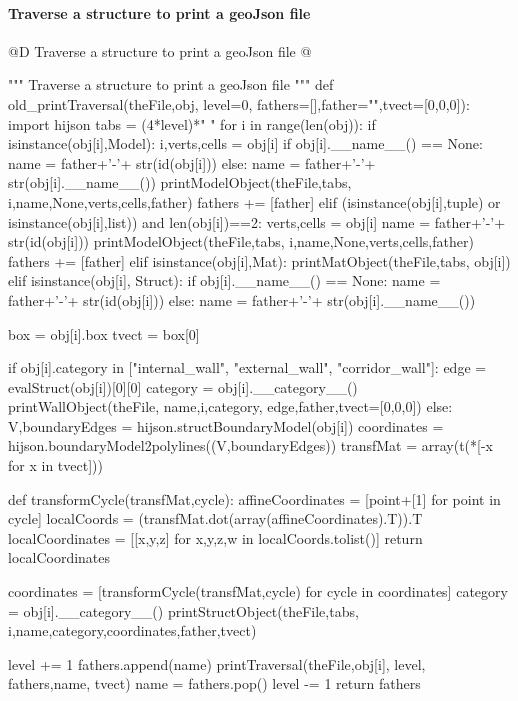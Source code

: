 \documentclass[11pt,oneside]{article}	%
\begin{document}
\paragraph{Traverse a structure to print a geoJson file}

@D Traverse a structure to print a geoJson file
@{""" Traverse a structure to print a geoJson file """
def old_printTraversal(theFile,obj, level=0, fathers=[],father="",tvect=[0,0,0]):
   import hijson
   tabs = (4*level)*" "
   for i in range(len(obj)):
	  if isinstance(obj[i],Model): 
		 i,verts,cells = obj[i]
		 if obj[i].__name__() == None:
			name = father+'-'+ str(id(obj[i]))
		 else: 
			name = father+'-'+ str(obj[i].__name__())
		 printModelObject(theFile,tabs, i,name,None,verts,cells,father)
		 fathers += [father]
	  elif (isinstance(obj[i],tuple) or isinstance(obj[i],list)) and len(obj[i])==2:
		 verts,cells = obj[i]
		 name = father+'-'+ str(id(obj[i]))
		 printModelObject(theFile,tabs, i,name,None,verts,cells,father)
		 fathers += [father]
	  elif isinstance(obj[i],Mat): 
		 printMatObject(theFile,tabs, obj[i])
	  elif isinstance(obj[i], Struct):
		 if obj[i].__name__() == None:
			name = father+'-'+ str(id(obj[i]))
		 else: 
			name = father+'-'+ str(obj[i].__name__())
			
		 box = obj[i].box
		 tvect = box[0]
		 
		 if obj[i].category in ["internal_wall", "external_wall", "corridor_wall"]:
			 edge = evalStruct(obj[i])[0][0]
			 category = obj[i].__category__()
			 printWallObject(theFile, name,i,category, edge,father,tvect=[0,0,0])
		 else:		
			 V,boundaryEdges = hijson.structBoundaryModel(obj[i])   
			 coordinates = hijson.boundaryModel2polylines((V,boundaryEdges))
			 transfMat = array(t(*[-x for x in tvect]))
			 
			 def transformCycle(transfMat,cycle):
				 affineCoordinates = [point+[1] for point in cycle]
				 localCoords = (transfMat.dot(array(affineCoordinates).T)).T
				 localCoordinates = [[x,y,z] for x,y,z,w in localCoords.tolist()]
				 return localCoordinates
				 
			 coordinates = [transformCycle(transfMat,cycle) for cycle in coordinates]
			 category = obj[i].__category__()
			 printStructObject(theFile,tabs, i,name,category,coordinates,father,tvect)
			 
		 level += 1
		 fathers.append(name)
		 printTraversal(theFile,obj[i], level, fathers,name, tvect)
		 name = fathers.pop()
		 level -= 1
   return fathers



}
\end{document}
